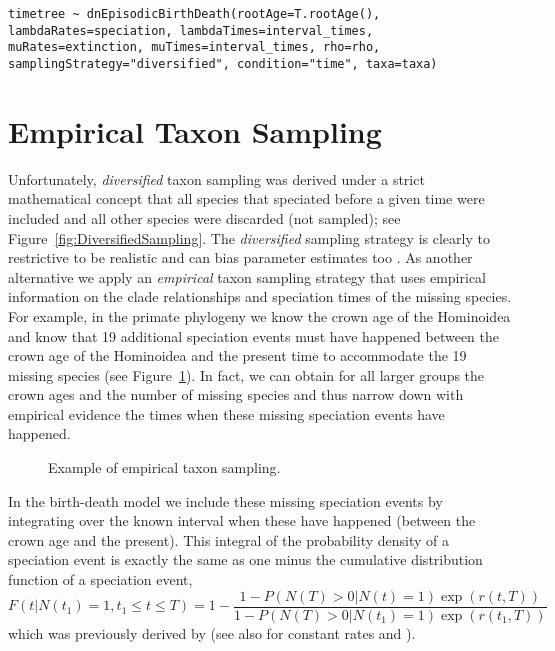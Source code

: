 {\tt \begin{snugshade*}
\begin{lstlisting}
timetree ~ dnEpisodicBirthDeath(rootAge=T.rootAge(), lambdaRates=speciation, lambdaTimes=interval_times, muRates=extinction, muTimes=interval_times, rho=rho, samplingStrategy="diversified", condition="time", taxa=taxa)
\end{lstlisting}
\end{snugshade*}}


\newpage
\section{Empirical Taxon Sampling}

Unfortunately, \emph{diversified} taxon sampling was derived under a strict mathematical concept that all species that speciated before a given time were included and all other species were discarded (not sampled); see Figure~\ref{fig:DiversifiedSampling}.
The \emph{diversified} sampling strategy is clearly to restrictive to be realistic and can bias parameter estimates too \citep{Hohna2014a}.
As another alternative we apply an \emph{empirical} taxon sampling strategy that uses empirical information on the clade relationships and speciation times of the missing species.
For example, in the primate phylogeny we know the crown age of the Hominoidea and know that 19 additional speciation events must have happened between the crown age of the Hominoidea and the present time to accommodate the 19 missing species (see Figure~\ref{fig:EmpiricalSampling}).
In fact, we can obtain for all larger groups the crown ages and the number of missing species and thus narrow down with empirical evidence the times when these missing speciation events have happened.

\begin{figure}[h!]
\centering
{}
\caption{\small Example of empirical taxon sampling. }
\label{fig:EmpiricalSampling}
\end{figure}

In the birth-death model we include these missing speciation events by integrating over the known interval when these have happened (between the crown age and the present).
This integral of the probability density of a speciation event is exactly the same as one minus the cumulative distribution function of a speciation event, 
\begin{equation}
F(t|N(t_1)=1,t_1\leq t \leq T) = 1 - \frac{1-P(N(T)>0|N(t)=1)\exp{(r(t,T))}}{1-P(N(T)>0|N(t_1)=1)\exp{(r(t_1,T))}} \label{spec_dist}
\end{equation}
which was previously derived by \citet[Equation~(6)]{Hoehna2014a} (see also \citet[Equation~(3)]{Yang1997} for constant rates and \citet[Equation~(8)]{Hoehna2013}).


